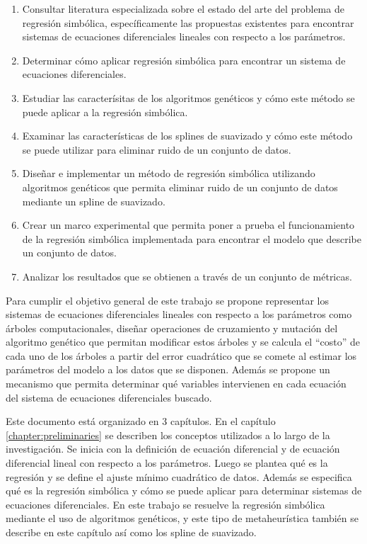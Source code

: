 \begin{enumerate}
    \item Consultar literatura especializada sobre el estado del arte del problema de regresión simbólica, específicamente las propuestas existentes para encontrar sistemas de ecuaciones diferenciales lineales con respecto a los parámetros.
    \item Determinar cómo aplicar regresión simbólica para encontrar un sistema de ecuaciones diferenciales.
    \item Estudiar las caracterísitas de los algoritmos genéticos y cómo este método se puede aplicar a la regresión simbólica.
    \item Examinar las características de los splines de suavizado y cómo este método se puede utilizar para eliminar ruido de un conjunto de datos.
    \item Diseñar e implementar un método de regresión simbólica utilizando algoritmos genéticos que permita eliminar ruido de un conjunto de datos mediante un spline de suavizado.
    \item Crear un marco experimental que permita poner a prueba el funcionamiento de la regresión simbólica implementada para encontrar el modelo que describe un conjunto de datos.
    \item Analizar los resultados que se obtienen a través de un conjunto de métricas.
\end{enumerate}

Para cumplir el objetivo general de este trabajo se propone representar los sistemas de ecuaciones diferenciales lineales con respecto a los parámetros como árboles computacionales, diseñar operaciones de cruzamiento y mutación del algoritmo genético que permitan modificar estos árboles y se calcula el ``costo'' de cada uno de los árboles a partir del error cuadrático que se comete al estimar los parámetros del modelo a los datos que se disponen. Además se propone un mecanismo que permita determinar qué variables intervienen en cada ecuación del sistema de ecuaciones diferenciales buscado.

Este documento está organizado en 3 capítulos. En el capítulo \ref{chapter:preliminaries} se describen los conceptos utilizados a lo largo de la investigación. Se inicia con la definición de ecuación diferencial y de ecuación diferencial lineal con respecto a los parámetros. Luego se plantea qué es la regresión y se define el ajuste mínimo cuadrático de datos. Además se especifica qué es la regresión simbólica y cómo se puede aplicar para determinar sistemas de ecuaciones diferenciales. En este trabajo se resuelve la regresión simbólica mediante el uso de algoritmos genéticos, y este tipo de metaheurística también se describe en este capítulo así como los spline de suavizado.

